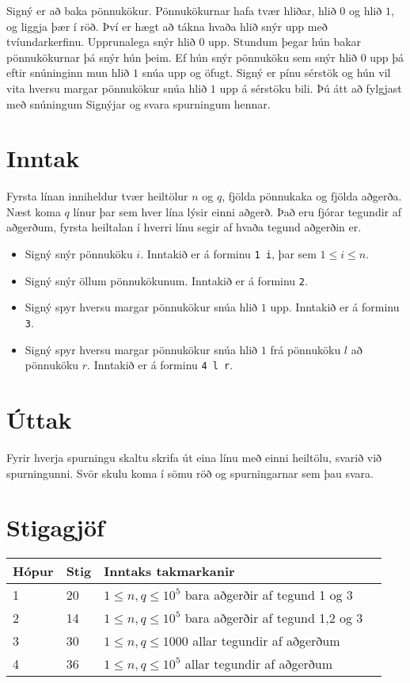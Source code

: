 Signý er að baka pönnukökur. Pönnukökurnar hafa tvær hliðar, hlið $0$ og hlið $1$, og liggja þær í röð. Því er hægt að tákna hvaða hlið snýr upp með tvíundarkerfinu.
Upprunalega snýr hlið $0$ upp. Stundum þegar hún bakar pönnukökurnar þá snýr hún þeim.
Ef hún snýr pönnuköku sem snýr hlið $0$ upp þá eftir snúninginn mun hlið $1$ snúa upp og öfugt.
Signý er pínu sérstök og hún vil vita hversu margar pönnukökur snúa hlið $1$ upp á sérstöku bili.
Þú átt að fylgjast með snúningum Signýjar og svara spurningum hennar.

\section*{Inntak}
Fyrsta línan inniheldur tvær heiltölur $n$ og $q$, fjölda pönnukaka og fjölda aðgerða.
Næst koma $q$ línur þar sem hver lína lýsir einni aðgerð.
Það eru fjórar tegundir af aðgerðum, fyrsta heiltalan í hverri línu segir af hvaða tegund aðgerðin er.
\begin{itemize}
    \item Signý snýr pönnuköku $i$. Inntakið er á forminu \texttt{1 i}, þar sem $1 \leq i \leq n$.
    \item Signý snýr öllum pönnukökunum. Inntakið er á forminu \texttt{2}.
    \item Signý spyr hversu margar pönnukökur snúa hlið $1$ upp. Inntakið er á forminu \texttt{3}.
    \item Signý spyr hversu margar pönnukökur snúa hlið $1$ frá pönnuköku $l$ að pönnuköku $r$. Inntakið er á forminu \texttt{4 l r}.
\end{itemize}

\section*{Úttak}
Fyrir hverja spurningu skaltu skrifa út eina línu með einni heiltölu, svarið við spurningunni. Svör skulu koma í sömu röð og spurningarnar sem þau svara.

\section*{Stigagjöf}
\begin{tabular}{|l|l|l|l|}

\hline
Hópur & Stig & Inntaks takmarkanir \\ \hline
1     & 20  & $1 \leq n,q \leq 10^5$ bara aðgerðir af tegund 1 og 3 \\ \hline
2     & 14  & $1 \leq n,q \leq 10^5$ bara aðgerðir af tegund 1,2 og 3 \\ \hline
3     & 30  & $1 \leq n,q \leq 1000$ allar tegundir af aðgerðum \\ \hline
4     & 36  & $1 \leq n,q \leq 10^5$ allar tegundir af aðgerðum \\ \hline
\end{tabular}
